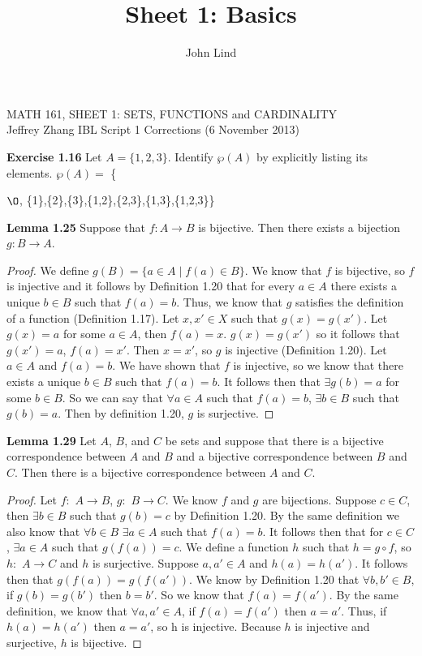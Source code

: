 \documentclass[12pt]{article}
\title{Sheet 1: Basics}
\author{John Lind}
\renewcommand{\emptyset}{\O}
\theoremstyle{definition}
\numberwithin{equation}{subsection}
\begin{document}
\pagestyle{plain}



\begin{center}
{\large MATH 161, SHEET 1: SETS, FUNCTIONS and CARDINALITY} \\ 
\vspace{.2in}  
Jeffrey Zhang IBL Script 1 Corrections (6 November 2013)
\end{center}

\bigskip \bigskip

\medskip

\textbf{Exercise 1.16}
Let $A=\{1,2,3\}$.  Identify $\wp(A)$ by explicitly listing its elements.
$\wp(A) = $ \{{$\emptyset$, \{{1\}},\{{2\}},\{{3\}},\{{1,2\}},\{{2,3\}},\{{1,3\}},\{{1,2,3\}}\}

\medskip

\textbf{Lemma 1.25}
Suppose that $f \colon A \rightarrow B$ is bijective.  
Then there exists a bijection $g \colon B \rightarrow A$.

\begin {proof}
We define $g(B) = \{a \in A \mid f(a) \in B\}$. We know that $f$ is bijective, so $f$ is injective and it follows by Definition 1.20 that for every $a \in A$ there exists a unique $b \in B$ such that $f(a) = b$. Thus, we know that $g$ satisfies the definition of a function (Definition 1.17). Let $x, x' \in X$ such that $g(x) = g(x')$. Let $g(x) = a$ for some $a \in A$, then $f(a) = x$. $g(x) = g(x')$ so it follows that $g(x') = a$, $f(a) = x'$. Then $x = x'$, so $g$ is injective (Definition 1.20). Let $a \in A$ and $f(a) = b$. We have shown that $f$ is injective, so we know that there exists a unique $b \in B$ such that $f(a) = b$. It follows then that $\exists g(b) = a$ for some $b \in B$. So we can say that $\forall a \in A$ such that $f(a) = b$, $\exists b \in B$ such that $g(b) = a$. Then by definition 1.20, $g$ is surjective.
\end {proof}

\textbf{Lemma 1.29} Let $A$, $B$, and $C$ be sets and suppose that there is a bijective correspondence between $A$ and $B$ and a bijective correspondence between $B$ and $C$.  Then there is a bijective correspondence between $A$ and $C$.
\begin{proof}
Let $f: $ $A \to B$, $g: $ $B \to C$. We know $f$ and $g$ are bijections. Suppose $c \in C$, then $\exists b \in B$ such that $g(b) = c$ by Definition 1.20. By the same definition we also know that $\forall b  \in B$ $\exists a \in A$ such that $f(a) = b$. It follows then that for $c \in C$, $\exists a \in A$ such that $g(f(a)) = c$. We define a function $h$ such that $h = g \circ f$, so $h: $ $A \to C$ and $h$ is surjective.
Suppose $a, a' \in A$ and $h(a) = h(a')$. It follows then that $g(f(a)) = g(f(a'))$. We know by Definition 1.20 that $\forall b, b' \in B$, if $g(b) = g(b')$ then $b = b'$. So we know that $f(a) = f(a')$. By the same definition, we know that $\forall a, a' \in A$, if $f(a) = f(a')$ then $a = a'$. Thus, if $h(a) = h(a')$ then $a = a'$, so h is injective. Because $h$ is injective and surjective, $h$ is bijective.
\end{proof}

}
\end{document}
